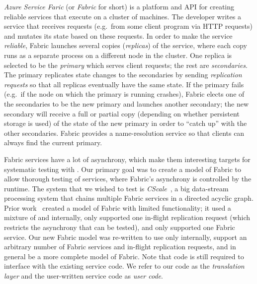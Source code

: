 \emph{Azure Service Faric} (or \emph{Fabric} for short) is a platform and API for creating reliable services that execute on a cluster of machines. The developer writes a service that receives requests (e.g.\ from some client program via HTTP requests) and mutates its state based on these requests. In order to make the service \emph{reliable}, Fabric launches several copies (\emph{replicas}) of the service, where each copy runs as a separate process on a different node in the cluster. One replica is selected to be the \emph{primary} which serves client requests; the rest are \emph{secondaries}. The primary replicates state changes to the secondaries by sending \emph{replication requests} so that all replicas eventually have the same state. If the primary fails (e.g.\ if the node on which the primary is running crashes), Fabric elects one of the secondaries to be the new primary and launches another secondary; the new secondary will receive a full or partial copy (depending on whether persistent storage is used) of the state of the new primary in order to ``catch up'' with the other secondaries. Fabric provides a name-resolution service so that clients can always find the current primary. 

Fabric services have a lot of asynchrony, which make them interesting targets for systematic testing with \psharp{}.
Our primary goal was to create a \psharp{} model of Fabric to allow
thorough testing of services, where Fabric's asynchrony is controlled 
by the \psharp{} runtime.
The system that we wished to test is \emph{CScale}~\cite{X},
a big data-stream processing system that chains multiple Fabric services
in a directed acyclic graph.
Prior work~\cite{deligiannis2015psharp}
created a model of Fabric with limited functionality;
it used a mixture of \csharp{} and \psharp{} internally,
only supported one in-flight replication request
(which restricts the asynchrony that can be tested),
and only supported one Fabric service.
Our new Fabric model was re-written to use only \psharp{}
internally,
support an arbitrary number of Fabric services and in-flight replication requests,
and in general be a more complete model of Fabric.
Note that \csharp{} code is still required to interface with the existing
\csharp{} service code.
We refer to our \csharp{} code
as the \emph{translation layer}
and
 the user-written \csharp{} service code as \emph{user code}. 

